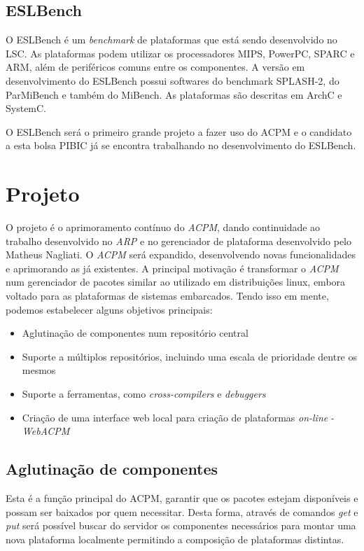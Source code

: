 \documentclass[10pt,a4paper]{article}
\begin{document}
\subsection{ESLBench}
O ESLBench é um \textit{benchmark} de plataformas que está sendo
desenvolvido no LSC. As plataformas podem utilizar os processadores
MIPS, PowerPC, SPARC e ARM, além de periféricos comuns entre os
componentes. A versão em desenvolvimento do ESLBench possui softwares
do benchmark SPLASH-2\cite{splash2,parsec-splash}, do ParMiBench\cite{parmibench} e
também do MiBench\cite{mibench}. As plataformas são descritas em
ArchC e SystemC.

O ESLBench será o primeiro grande projeto a fazer uso do
ACPM e o candidato a esta bolsa PIBIC já se encontra trabalhando no
desenvolvimento do ESLBench.

        

\section{Projeto}
O projeto é o aprimoramento contínuo do \textit{ACPM}, dando
continuidade ao trabalho desenvolvido no \textit{ARP} e no gerenciador
de plataforma desenvolvido pelo Matheus Nagliati. O \textit{ACPM} será
expandido, desenvolvendo novas funcionalidades e aprimorando as já
existentes. A principal motivação é transformar o \textit{ACPM} num
gerenciador de pacotes similar ao utilizado em distribuições linux, 
embora voltado para as plataformas de sistemas embarcados. Tendo isso
em mente, podemos estabelecer alguns objetivos principais:

\begin{itemize}
\item Aglutinação de componentes num repositório central
\item Suporte a múltiplos repositórios, incluindo uma escala de prioridade dentre os mesmos
\item Suporte a ferramentas, como \textit{cross-compilers} e \textit{debuggers}
\item Criação de uma interface web local para criação de plataformas \textit{on-line} - \textit{WebACPM}
\end{itemize}

\subsection{Aglutinação de componentes}
Esta é a função principal do ACPM, garantir que os pacotes estejam
disponíveis e possam ser baixados por quem necessitar. Desta forma,
através de comandos \textit{get} e \textit{put} será possível buscar
do servidor os componentes necessários para montar uma nova plataforma
localmente permitindo a composição de plataformas distintas.
\end{document}
